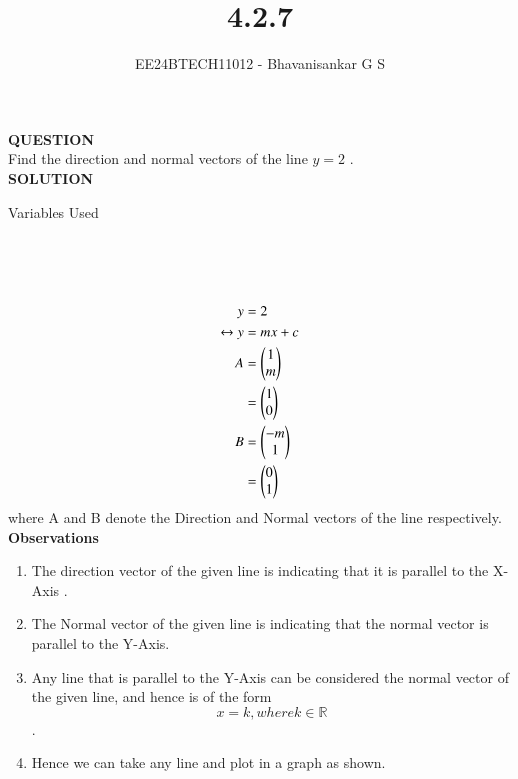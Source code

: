 \documentclass[journal]{IEEEtran}
\begin{document}

\vspace{3cm}

\title{4.2.7}
\author{EE24BTECH11012 - Bhavanisankar G S}
{\let\newpage\relax\maketitle}

\renewcommand{\thefigure}{\theenumi}
\renewcommand{\thetable}{\theenumi}
\setlength{\intextsep}{10pt} %


\renewcommand{\thetable}{\theenumi}

\textbf{QUESTION} \\
Find the direction and normal vectors of the line $y=2$ . \\
\textbf{SOLUTION} \\

\begin{table}[h!]
	\centering
        
	\caption{Variables Used}
	\label{tab10.5.3.9.1}
\end{table} \\ \\ \\

\begin{align}
	y &=  2 \\
	\leftrightarrow y &= mx + c \\
	A &= \begin{pmatrix}1 \\ m\end{pmatrix} \\ 
	                 &= \begin{pmatrix}1 \\ 0\end{pmatrix} \\
	B &= \begin{pmatrix} -m \\ 1 \end{pmatrix} \\
	              &= \begin{pmatrix} 0 \\ 1 \end{pmatrix} \\ 
\end{align}
where A and B denote the Direction and Normal vectors of the line respectively.
\textbf{Observations}\\
\begin{enumerate}
	\item The direction vector of the given line is  indicating that it is parallel to the X-Axis .
	\item The Normal vector of the given line is  indicating that the normal vector is parallel to the Y-Axis.
	\item Any line that is parallel to the Y-Axis can be considered the normal vector of the given line, and hence is of the form $$ x = k, where k \in \mathbb{R} $$ .
	\item Hence we can take any line and plot in a graph as shown.
\end{enumerate}
\end{document}
